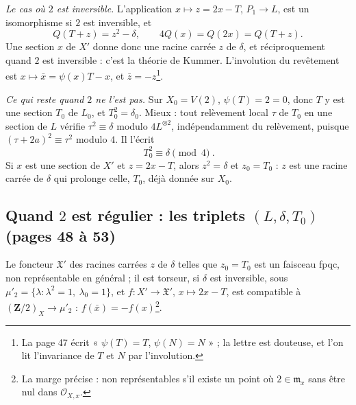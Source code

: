 \documentclass[11pt,a4paper]{article}
\begin{document}
\emph{Le cas où $2$ est inversible.} L'application $x \mapsto z = 2x - T$, $P_1 \to L$,
est un isomorphisme si $2$ est inversible, et
\[
  Q(T + z) = z^{2} - \delta, \qquad 4Q(x) = Q(2x) = Q(T + z).
\]
Une section $x$ de $X'$ donne donc une racine carrée $z$ de $\delta$, et
réciproquement quand $2$ est inversible : c'est la théorie de Kummer. L'involution
du revêtement est $x \mapsto \bar{x} = \psi(x)T - x$, et $\bar{z} = -z$\footnote{La
page 47 écrit « $\psi(T) = T$, $\psi(N) = N$ » ; la lettre est douteuse, et l'on lit
l'invariance de $T$ et $N$ par l'involution.}.

\emph{Ce qui reste quand $2$ ne l'est pas.} Sur $X_0 = V(2)$, $\psi(T) = 2 = 0$, donc
$T$ y est une section $T_0$ de $L_0$, et $T_0^{2} = \delta_0$. Mieux : tout relèvement
local $\tau$ de $T_0$ en une section de $L$ vérifie $\tau^{2} \equiv \delta$ modulo
$4L^{\otimes 2}$, indépendamment du relèvement, puisque $(\tau + 2a)^{2} \equiv \tau^{2}$
modulo $4$. Il l'écrit
\[
  \boxed{\ T_0^{2} \equiv \delta \pmod 4\ }.
\]
Si $x$ est une section de $X'$ et $z = 2x - T$, alors $z^{2} = \delta$ et $z_0 = T_0$ :
$z$ est une racine carrée de $\delta$ qui prolonge celle, $T_0$, déjà donnée sur
$X_0$.

\subsection*{Quand $2$ est régulier : les triplets $(L, \delta, T_0)$ (pages 48 à 53)}

Le foncteur $\mathfrak{X}'$ des racines carrées $z$ de $\delta$ telles que $z_0 = T_0$
est un faisceau fpqc, non représentable en général ; il est torseur, si $\delta$ est
inversible, sous $\mu'_2 = \{\lambda : \lambda^{2} = 1,\ \lambda_0 = 1\}$, et $f : X' \to
\mathfrak{X}'$, $x \mapsto 2x - T$, est compatible à $(\mathbf{Z}/2)_X \to \mu'_2$ :
$f(\bar{x}) = -f(x)$\footnote{La marge précise : non représentables s'il existe un
point où $2 \in \mathfrak{m}_x$ sans être nul dans $\mathcal{O}_{X,x}$.}.
\end{document}
